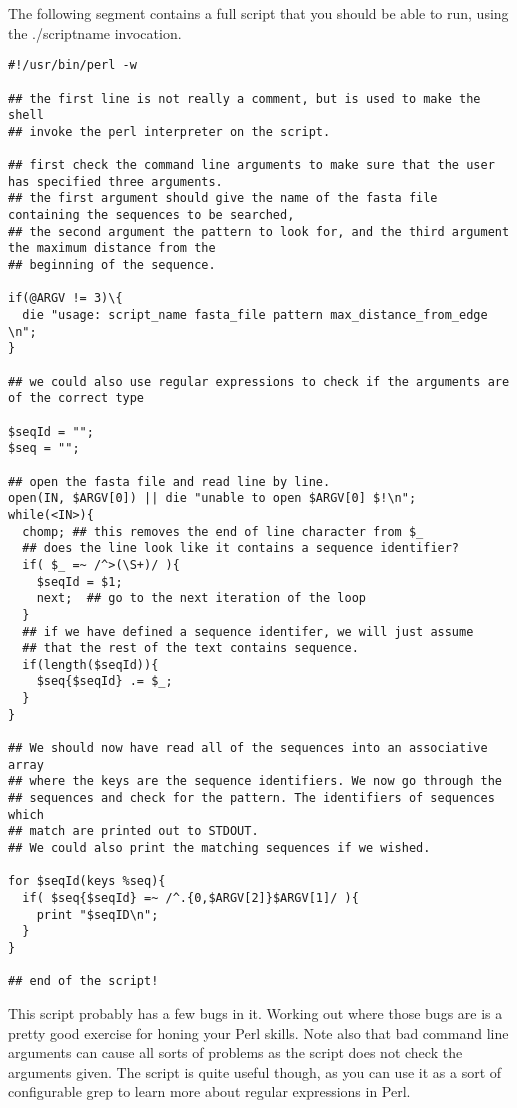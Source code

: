 \documentclass[11pt]{article}
\begin{document}
The following segment contains a full script that you should be able to
run, using the ./scriptname invocation.

\begin{verbatim}
#!/usr/bin/perl -w

## the first line is not really a comment, but is used to make the shell 
## invoke the perl interpreter on the script.

## first check the command line arguments to make sure that the user has specified three arguments.
## the first argument should give the name of the fasta file containing the sequences to be searched,
## the second argument the pattern to look for, and the third argument the maximum distance from the
## beginning of the sequence.

if(@ARGV != 3)\{
  die "usage: script_name fasta_file pattern max_distance_from_edge \n";
}

## we could also use regular expressions to check if the arguments are of the correct type

$seqId = "";
$seq = "";

## open the fasta file and read line by line.
open(IN, $ARGV[0]) || die "unable to open $ARGV[0] $!\n";
while(<IN>){
  chomp; ## this removes the end of line character from $_
  ## does the line look like it contains a sequence identifier?
  if( $_ =~ /^>(\S+)/ ){
    $seqId = $1;
    next;  ## go to the next iteration of the loop
  }
  ## if we have defined a sequence identifer, we will just assume
  ## that the rest of the text contains sequence.
  if(length($seqId)){
    $seq{$seqId} .= $_;
  }
}

## We should now have read all of the sequences into an associative array 
## where the keys are the sequence identifiers. We now go through the 
## sequences and check for the pattern. The identifiers of sequences which 
## match are printed out to STDOUT. 
## We could also print the matching sequences if we wished.

for $seqId(keys %seq){
  if( $seq{$seqId} =~ /^.{0,$ARGV[2]}$ARGV[1]/ ){
    print "$seqID\n";
  }
}

## end of the script!
\end{verbatim}

This script probably has a few bugs in it. Working out where those bugs
are is a pretty good exercise for honing your Perl skills. Note also
that bad command line arguments can cause all sorts of problems as the
script does not check the arguments given. The script is quite useful
though, as you can use it as a sort of configurable grep to learn more
about regular expressions in Perl.
\end{document}
